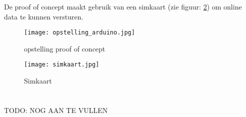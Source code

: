 De proof of concept maakt gebruik van een simkaart (zie figuur: \ref{fig:simkaart}) om online data te kunnen versturen. 
\begin{figure}
	\texttt{[image: opstelling\_arduino.jpg]}
	\caption{opstelling proof of concept}
	\label{fig:opstelling_arduino}
\end{figure}
\begin{figure}
	\texttt{[image: simkaart.jpg]}
	\caption{Simkaart}
	\label{fig:simkaart}
\end{figure}

\section{}
TODO: NOG AAN TE VULLEN